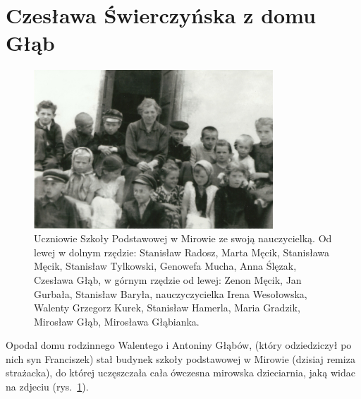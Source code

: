 \section{Czesława Świerczyńska z domu Głąb}

\begin{figure}[!h]
\begin{center}
\includegraphics[width=0.8\textwidth]{zdjecia/szkola_w_mirowie.jpg}
\caption[Uczniowie Szkoły Podstawowej w Mirowie]{Uczniowie Szkoły Podstawowej w Mirowie ze swoją nauczycielką. Od lewej w dolnym rzędzie: Stanisław Radosz, Marta Męcik, Stanisława Męcik, Stanisław Tylkowski, Genowefa Mucha, Anna Ślęzak, Czesława Głąb, w górnym rzędzie od lewej: Zenon Męcik, Jan Gurbała, Stanisław Baryła, nauczyczycielka Irena Wesołowska, Walenty Grzegorz Kurek, Stanisław Hamerla, Maria Gradzik, Mirosław Głąb, Mirosława Głąbianka.}
\label{rys:szkola_w_mirowie}
\end{center}
\end{figure}


Opodal domu rodzinnego Walentego i Antoniny Głąbów, (który odziedziczył po nich syn Franciszek) stał budynek szkoły podstawowej w Mirowie (dzisiaj remiza strażacka), do której uczęszczała cała ówczesna mirowska dzieciarnia, jaką widac na zdjeciu (rys.~\ref{rys:szkola_w_mirowie}).


